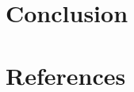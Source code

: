 \documentclass{article}[12pt]
\begin{document}
\begin{multicols}{2}
\section{Conclusion}

\section{References}
\end{multicols}
\end{document}
